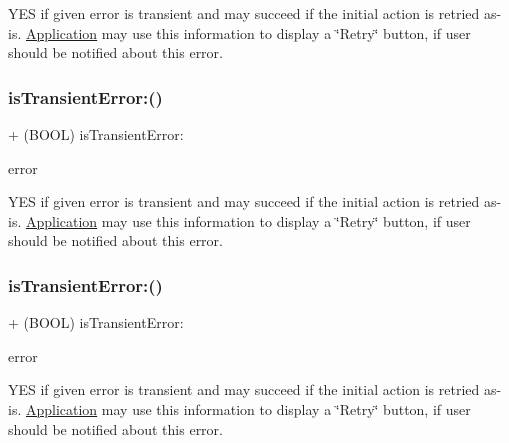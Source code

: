 Y\+ES if given error is transient and may succeed if the initial action is retried as-\/is. \hyperlink{classApplication}{Application} may use this information to display a \char`\"{}\+Retry\char`\"{} button, if user should be notified about this error. \mbox{\label{interfaceFBErrorUtility_a0bab53fff61ccb645f5647e1a03287c3}} 
\subsubsection{\texorpdfstring{is\+Transient\+Error\+:()}{isTransientError:()}\hspace{0.1cm}{\footnotesize\ttfamily [3/5]}}
{\footnotesize\ttfamily + (B\+O\+OL) is\+Transient\+Error\+: \begin{DoxyParamCaption}\item[{(N\+S\+Error $\ast$)}]{error }\end{DoxyParamCaption}}

Y\+ES if given error is transient and may succeed if the initial action is retried as-\/is. \hyperlink{classApplication}{Application} may use this information to display a \char`\"{}\+Retry\char`\"{} button, if user should be notified about this error. \mbox{\label{interfaceFBErrorUtility_a0bab53fff61ccb645f5647e1a03287c3}} 
\subsubsection{\texorpdfstring{is\+Transient\+Error\+:()}{isTransientError:()}\hspace{0.1cm}{\footnotesize\ttfamily [4/5]}}
{\footnotesize\ttfamily + (B\+O\+OL) is\+Transient\+Error\+: \begin{DoxyParamCaption}\item[{(N\+S\+Error $\ast$)}]{error }\end{DoxyParamCaption}}

Y\+ES if given error is transient and may succeed if the initial action is retried as-\/is. \hyperlink{classApplication}{Application} may use this information to display a \char`\"{}\+Retry\char`\"{} button, if user should be notified about this error. \mbox{\label{interfaceFBErrorUtility_a0bab53fff61ccb645f5647e1a03287c3}} 

